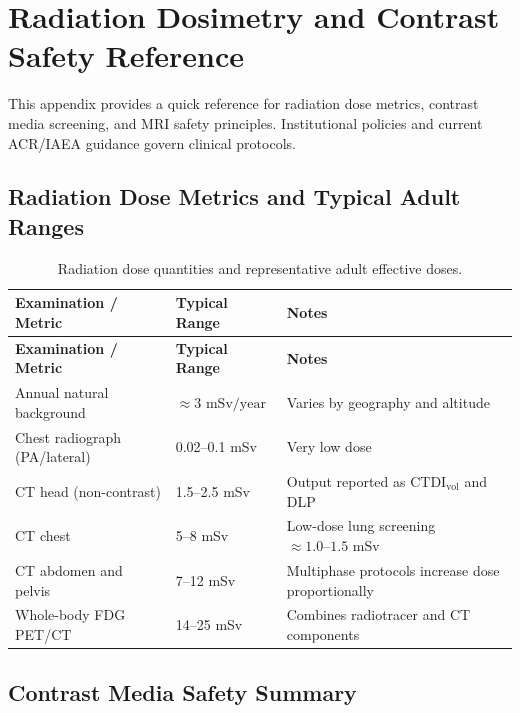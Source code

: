 \chapter{Radiation Dosimetry and Contrast Safety Reference}
\label{app:radiation_contrast}

This appendix provides a quick reference for radiation dose metrics, contrast media screening, and MRI safety principles. Institutional policies and current ACR/IAEA guidance govern clinical protocols.

\section{Radiation Dose Metrics and Typical Adult Ranges}

\begin{longtable}{@{}p{}p{}p{}@{}}
\caption{Radiation dose quantities and representative adult effective doses.}
\label{tab:app_dose_reference} \\
\toprule
\textbf{Examination / Metric} & \textbf{Typical Range} & \textbf{Notes} \\
\midrule
\endfirsthead
\toprule
\textbf{Examination / Metric} & \textbf{Typical Range} & \textbf{Notes} \\
\midrule
\endhead
Annual natural background & $\approx 3\text{ mSv/year}$ & Varies by geography and altitude \\
Chest radiograph (PA/lateral) & 0.02--0.1 mSv & Very low dose \\
CT head (non-contrast) & 1.5--2.5 mSv & Output reported as $\text{CTDI}_{\text{vol}}$ and DLP \\
CT chest & 5--8 mSv & Low-dose lung screening $\approx 1.0\text{--}1.5\text{ mSv}$ \\
CT abdomen and pelvis & 7--12 mSv & Multiphase protocols increase dose proportionally \\
Whole-body FDG PET/CT & 14--25 mSv & Combines radiotracer and CT components \\
\bottomrule
\end{longtable}

\section{Contrast Media Safety Summary}

